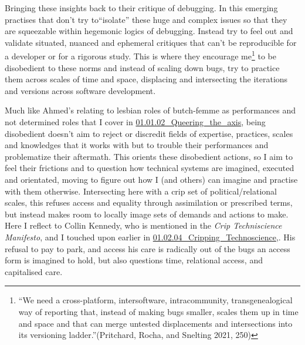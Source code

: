 Bringing these insights back to their critique of debugging. In this
emerging practises that don't try to``isolate'' these huge and complex
issues so that they are squeezable within hegemonic logics of debugging.
Instead try to feel out and validate situated, nuanced and ephemeral
critiques that can't be reproducible for a developer or for a rigorous
study. This is where they encourage me\footnote{``We need a
  cross-platform, intersoftware, intracommunity, transgenealogical way
  of reporting that, instead of making bugs smaller, scales them up in
  time and space and that can merge untested displacements and
  intersections into its versioning ladder.''(Pritchard, Rocha, and
  Snelting 2021, 250)} to be disobedient to these norms and instead of
scaling down bugs, try to practice them across scales of time and space,
displacing and intersecting the iterations and versions across software
development.

Much like Ahmed's relating to lesbian roles of butch-femme as
performances and not determined roles that I cover in
\href{../../01_Disability_justice_and_life_affirmation_flipping_the_table/sections/01.01.02_Queering_the_axis.md}{01.01.02\_Queering\_the\_axis},
being disobedient doesn't aim to reject or discredit fields of
expertise, practices, scales and knowledges that it works with but to
trouble their performances and problematize their aftermath. This
orients these disobedient actions, so I aim to feel their frictions and
to question how technical systems are imagined, executed and orientated,
moving to figure out how I (and others) can imagine and practise with
them otherwise. Intersecting here with a crip set of
political/relational scales, this refuses access and equality through
assimilation or prescribed terms, but instead makes room to locally
image sets of demands and actions to make. Here I reflect to Collin
Kennedy, who is mentioned in the \emph{Crip Techniscience Manifesto},
and I touched upon earlier in
\href{../../01_Disability_justice_and_life_affirmation_flipping_the_table/sections/01.02.04_Cripping_Technoscience.md}{01.02.04\_Cripping\_Technoscience},.
His refusal to pay to park, and access his care is radically out of the
bugs an access form is imagined to hold, but also questions time,
relational access, and capitalised care.

